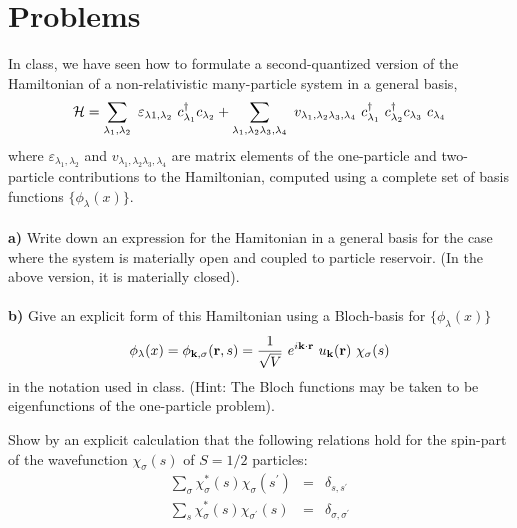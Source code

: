 \section*{Problems}

\begin{problem}
	In class, we have seen how to formulate a second-quantized version of the Hamiltonian of a non-relativistic many-particle system in a general basis,
	\begin{eqnarray}
		\mathcal{H} = \sum_{\lambda_1,\lambda_2} ~ \varepsilon_{\lambda1,\lambda_2}~ c^{\dagger}_{\lambda_1}  c_{\lambda_2} 
		+ \sum_{\lambda_1,\lambda_2\lambda_3,\lambda_4}
		~v_{\lambda_1,\lambda_2\lambda_3,\lambda_4}~
		c^{\dagger}_{\lambda_1} ~ c^{\dagger}_{\lambda_2}  c_{\lambda_3} ~ c_{\lambda_4}  \nonumber
	\end{eqnarray}
	where $\varepsilon_{\lambda_1,\lambda_2}$ and $v_{\lambda_1,\lambda_2\lambda_3,\lambda_4}$ are matrix elements of the one-particle and two-particle contributions to the Hamiltonian, computed using a complete set of basis functions $\{ \phi_{\lambda}(x) \}$.
	\ \\
	\ \\
	{\bf a)} Write down an expression for the Hamitonian in a general basis for the case where the system is materially open and coupled to particle reservoir. (In the above version, it is materially closed).
	\ \\
	\ \\
	{\bf b) } Give an explicit form of this   Hamiltonian using a Bloch-basis for $\{ \phi_{\lambda}(x) \}$
	\begin{eqnarray}
		\phi_{\lambda}(x) = \phi_{{\bf k},\sigma}({\bf r},s)  = \frac{1}{\sqrt{V}} ~e^{i {\bf k} \cdot {\bf r}} ~ u_{\bf k} ({\bf r}) ~ \chi_{\sigma}(s) \nonumber
	\end{eqnarray}
	in the notation used in class. (Hint: The Bloch functions may be taken to be eigenfunctions of the one-particle problem). 
\end{problem}
\begin{problem}
	
	Show by an explicit calculation that the following relations hold for the spin-part of the wavefunction $\chi_\sigma(s)$ of $S=1/2$ particles:
	\begin{eqnarray}
		\sum_{\sigma} \chi^*_\sigma(s)  \chi_\sigma(s^{\prime}) & = & \delta_{s,s^{\prime}} \nonumber \\
		\sum_{s} \chi^*_\sigma(s)  \chi_{\sigma^{\prime}}(s) & = & \delta_{\sigma,\sigma^{\prime}} \nonumber
	\end{eqnarray}
\end{problem}
